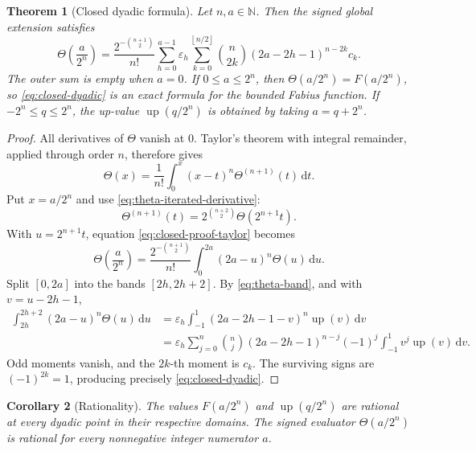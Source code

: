 \documentclass[11pt,oneside]{article}
\newtheorem{theorem}{Theorem}[section]
\newtheorem{corollary}[theorem]{Corollary}
\theoremstyle{definition}
\theoremstyle{remark}
\newcommand{\upf}{\operatorname{up}}
\newcommand{\epsTM}{\varepsilon}
\newcommand{\dd}{\,\mathrm d}
\newcommand{\N}{\mathbb N}
\newcommand{\Thetaf}{\Theta}
\newcommand{\floor}[1]{\left\lfloor#1\right\rfloor}
\begin{document}
\begin{theorem}[Closed dyadic formula]\label{thm:closed-dyadic}
Let $n,a\in\N$.  Then the signed global extension satisfies
\begin{equation}\label{eq:closed-dyadic}
 \Thetaf\left(\frac{a}{2^n}\right)
 =\frac{2^{-\binom{n+1}{2}}}{n!}
 \sum_{h=0}^{a-1}\epsTM_h
 \sum_{k=0}^{\floor{n/2}}
 \binom n{2k}(2a-2h-1)^{n-2k}c_k.
\end{equation}
The outer sum is empty when $a=0$.  If $0\le a\le2^n$, then
$\Thetaf(a/2^n)=F(a/2^n)$, so \eqref{eq:closed-dyadic} is an exact formula for the
bounded Fabius function.  If $-2^n\le q\le2^n$, the up-value
$\upf(q/2^n)$ is obtained by taking $a=q+2^n$.
\end{theorem}

\begin{proof}
All derivatives of $\Thetaf$ vanish at $0$.  Taylor's theorem with integral
remainder, applied through order $n$, therefore gives
\begin{equation}\label{eq:closed-proof-taylor}
 \Thetaf(x)=\frac1{n!}\int_0^x(x-t)^n\Thetaf^{(n+1)}(t)\dd t.
\end{equation}
Put $x=a/2^n$ and use \eqref{eq:theta-iterated-derivative}:
\[
 \Thetaf^{(n+1)}(t)=2^{\binom{n+2}{2}}\Thetaf(2^{n+1}t).
\]
With $u=2^{n+1}t$, equation \eqref{eq:closed-proof-taylor} becomes
\begin{equation}\label{eq:closed-proof-scaled}
 \Thetaf\left(\frac a{2^n}\right)
 =\frac{2^{-\binom{n+1}{2}}}{n!}
 \int_0^{2a}(2a-u)^n\Thetaf(u)\dd u.
\end{equation}
Split $[0,2a]$ into the bands $[2h,2h+2]$.  By
\eqref{eq:theta-band}, and with $v=u-2h-1$,
\begin{align*}
 \int_{2h}^{2h+2}(2a-u)^n\Thetaf(u)\dd u
 &=\epsTM_h\int_{-1}^{1}
   (2a-2h-1-v)^n\upf(v)\dd v\\
 &=\epsTM_h\sum_{j=0}^n\binom nj
   (2a-2h-1)^{n-j}(-1)^j
   \int_{-1}^{1}v^j\upf(v)\dd v.
\end{align*}
Odd moments vanish, and the $2k$-th moment is $c_k$.  The surviving signs are
$(-1)^{2k}=1$, producing precisely \eqref{eq:closed-dyadic}.
\end{proof}

\begin{corollary}[Rationality]\label{cor:dyadic-rationality}
The values $F(a/2^n)$ and $\upf(q/2^n)$ are rational at every dyadic point in
their respective domains.  The signed evaluator
$\Thetaf(a/2^n)$ is rational for every nonnegative integer numerator $a$.
\end{corollary}
\end{document}
